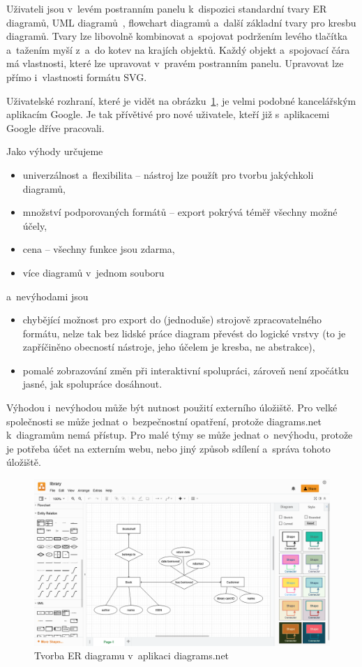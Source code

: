 Uživateli jsou v~levém postranním panelu k~dispozici standardní tvary ER
diagramů, UML diagramů~\cite{uml2017}, flowchart diagramů a~další základní tvary
pro kresbu diagramů. Tvary lze libovolně kombinovat a~spojovat podržením levého
tlačítka a~tažením myší z~a~do kotev na krajích objektů. Každý objekt
a~spojovací čára má vlastnosti, které lze upravovat v~pravém postranním panelu.
Upravovat lze přímo i~vlastnosti formátu SVG.

Uživatelské rozhraní, které je vidět na obrázku~\ref{fig:diagrams.net}, je velmi
podobné kancelářským aplikacím Google. Je tak přívětivé pro nové uživatele,
kteří již s~aplikacemi Google dříve pracovali.

Jako výhody určujeme
\begin{itemize}
  \item univerzálnost a~flexibilita -- nástroj lze použít pro tvorbu jakýchkoli
  diagramů,
  \item množství podporovaných formátů -- export pokrývá téměř všechny možné
  účely,
  \item cena -- všechny funkce jsou zdarma,
  \item více diagramů v~jednom souboru
\end{itemize}
a~nevýhodami jsou
\begin{itemize}
  \item chybějící možnost pro export do (jednoduše) strojově zpracovatelného
  formátu, nelze tak bez lidské práce diagram převést do logické vrstvy (to je
  zapříčiněno obecností nástroje, jeho účelem je kresba, ne abstrakce),
  \item pomalé zobrazování změn při interaktivní spolupráci, zároveň není
  zpočátku jasné, jak spolupráce dosáhnout.
\end{itemize}

Výhodou i~nevýhodou může být nutnost použití externího úložiště. Pro velké
společnosti se může jednat o~bezpečnostní opatření, protože diagrams.net
k~diagramům nemá přístup. Pro malé týmy se může jednat o~nevýhodu, protože je
potřeba účet na externím webu, nebo jiný způsob sdílení a~správa tohoto
úložiště.

\begin{figure}
  \centering
  \includegraphics[width = \textwidth]{../img/diagrams.net.png}
  \caption{Tvorba ER diagramu v~aplikaci diagrams.net}
  \label{fig:diagrams.net}
\end{figure}

